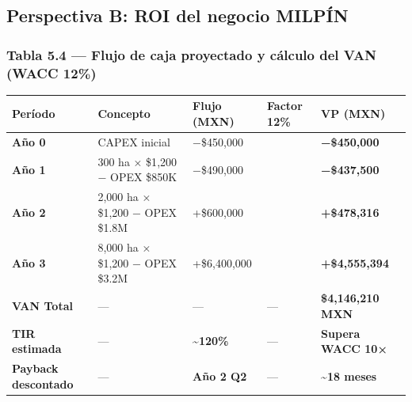 \documentclass[12pt,letterpaper]{article}
\newcommand{\tH}[1]{\cellcolor{azulOscuro}\color{white}\bfseries\small #1}
\newcommand{\fA}{\rowcolor{azulFila}}
\newcommand{\fG}{\rowcolor{green!12!white}}
\begin{document}
\subsection{Perspectiva B: ROI del negocio MILPÍN}

\subsubsection*{Tabla 5.4 — Flujo de caja proyectado y cálculo del VAN (WACC 12\%)}
\begin{tabularx}{\textwidth}{>{\small\bfseries}p{1.2cm} >{\small}X
    >{\small\centering\arraybackslash}p{3cm}
    >{\small\centering\arraybackslash}p{1.6cm}
    >{\small\bfseries\centering\arraybackslash}p{2.8cm}}
\toprule
\tH{Período} & \tH{Concepto} & \tH{Flujo (MXN)} & \tH{Factor 12\%} & \tH{VP (MXN)} \\
\midrule
Año 0  & CAPEX inicial                          & −\$450{,}000     & 1.0000 & −\$450{,}000 \\
\fA Año 1 & 300 ha × \$1{,}200 − OPEX \$850K  & −\$490{,}000     & 0.8929 & −\$437{,}500 \\
Año 2  & 2{,}000 ha × \$1{,}200 − OPEX \$1.8M & +\$600{,}000     & 0.7972 & +\$478{,}316 \\
\fA Año 3 & 8{,}000 ha × \$1{,}200 − OPEX \$3.2M & +\$6{,}400{,}000 & 0.7118 & +\$4{,}555{,}394 \\
\midrule
\fG \textbf{VAN Total}          & — & —                  & —      & \textbf{\$4{,}146{,}210 MXN} \\
\fG \textbf{TIR estimada}       & — & \textbf{\textasciitilde{}120\%} & — & Supera WACC 10× \\
\fG \textbf{Payback descontado} & — & \textbf{Año 2 Q2}  & —      & \textasciitilde{}18 meses \\
\bottomrule
\end{tabularx}

\vspace{6pt}
\end{document}
